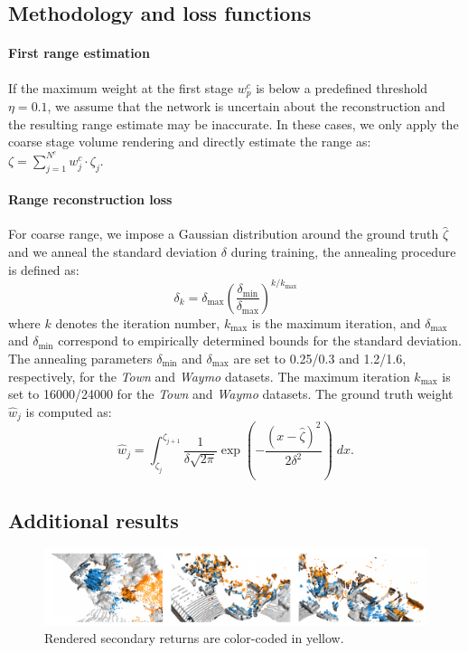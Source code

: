 \subsection{Methodology and loss functions}
\label{sec:supp_method}
\paragraph{First range estimation}
If the maximum weight at the first stage $w_p^c$ is below a predefined threshold $\eta=0.1$, we assume that the network is uncertain about the reconstruction and the resulting range estimate may be inaccurate. In these cases, we only apply the coarse stage volume rendering and directly estimate the range as: $\zeta = \sum_{j=1}^{N^c} w_j^c \cdot \zeta_j$. 

\paragraph{Range reconstruction loss}
For coarse range, we impose a Gaussian distribution around the ground truth $\hat{\zeta}$ and we anneal the standard deviation $\delta$ during training, the annealing procedure is defined as:
\begin{equation}
    \delta_k = \delta_{\max} \left(\frac{\delta_{\min}}{\delta_{\max}}\right)^{k / k_{\max}}
\end{equation}
where $k$ denotes the iteration number, $k_{\max}$ is the maximum iteration, and $\delta_{\max}$ and $\delta_{\min}$ correspond to empirically determined bounds for the standard deviation. The annealing parameters $\delta_{\min}$ and $\delta_{\max}$ are set to 0.25/0.3 and 1.2/1.6, respectively, for the \textit{Town} and \textit{Waymo} datasets. The maximum iteration $k_{\max}$ is set to 16000/24000 for the \textit{Town} and \textit{Waymo} datasets. 
The ground truth weight $\hat{w}_j$ is computed as:
\begin{equation}
    \hat{w}_j = \int_{\zeta_j}^{\zeta_{j+1}} \frac{1}{\delta\sqrt{2\pi}}\exp\left(-\frac{(x - \hat{\zeta})^2}{2\delta^2}\right) \; dx.
\end{equation}


\subsection{Additional results}
\label{sec:supp_results}

\begin{figure}[!t]
    \centering
        \includegraphics[width=0.8\columnwidth]{main/images/rebuttal_secondary_return.pdf}
        \caption{Rendered secondary returns are color-coded in {\setlength{\fboxsep}{0pt}\colorbox{sdpoints}{yellow}}.}
    \label{fig:iccv_rebuttal_second_return}
\end{figure}

